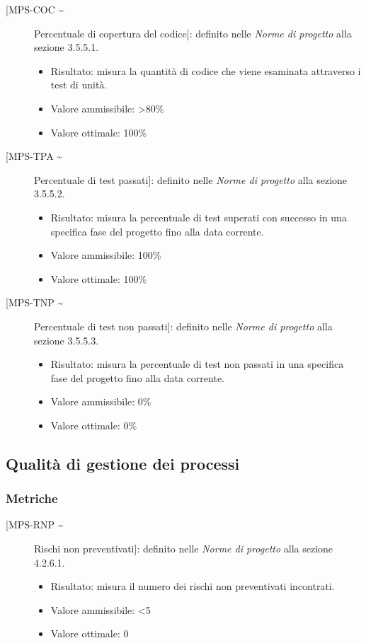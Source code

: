 \documentclass[../piano-di-qualifica.tex]{subfiles}
\begin{document}
\begin{description}
  \item [[MPS-COC \textasciitilde] Percentuale di copertura del codice]: definito nelle \textit{Norme di progetto} alla sezione 3.5.5.1.
        \begin{itemize} \item Risultato: misura la quantità di codice che viene esaminata attraverso i test di unità. \item Valore ammissibile: >80\% \item Valore ottimale: 100\% \end{itemize}
  \item [[MPS-TPA \textasciitilde] Percentuale di test passati]: definito nelle \textit{Norme di progetto} alla sezione 3.5.5.2.
        \begin{itemize} \item Risultato: misura la percentuale di test superati con successo in una specifica fase del progetto fino alla data corrente. \item Valore ammissibile: 100\% \item Valore ottimale: 100\% \end{itemize}
  \item [[MPS-TNP \textasciitilde] Percentuale di test non passati]: definito nelle \textit{Norme di progetto} alla sezione 3.5.5.3.
        \begin{itemize} \item Risultato: misura la percentuale di test non passati in una specifica fase del progetto fino alla data corrente. \item Valore ammissibile: 0\% \item Valore ottimale: 0\% \end{itemize}

\end{description}



\subsection{Qualità di gestione dei processi}%
\label{subsec:qualita_gestione_processi}

\subsubsection{Metriche}%
\label{subsec:metriche_gest_proc}

\begin{description}
  \item [[MPS-RNP \textasciitilde] Rischi non preventivati]: definito nelle \textit{Norme di progetto} alla sezione 4.2.6.1.
        \begin{itemize} \item Risultato: misura il numero dei rischi non preventivati incontrati. \item Valore ammissibile: <5 \item Valore ottimale: 0 \end{itemize}
\end{description}
\end{document}
